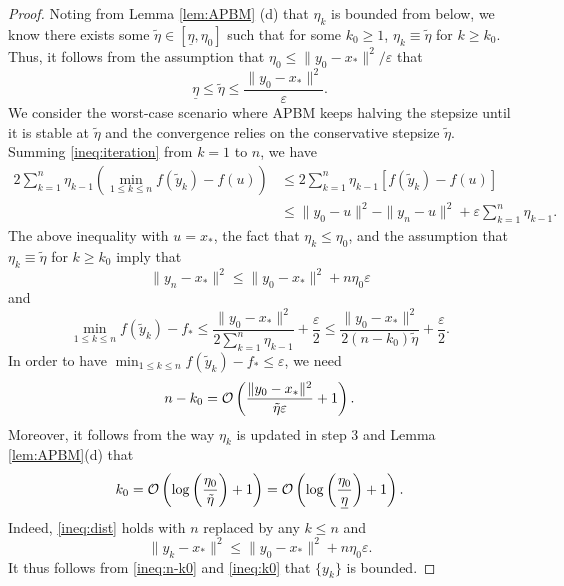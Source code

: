 \documentclass[11pt,letterpaper]{article}
\begin{document}
\begin{proof}
Noting from Lemma \ref{lem:APBM} (d) that $\eta_k$ is bounded from below, we know there exists some $\tilde \eta \in [\underline{\eta}, \eta_0]$ such that for some $k_0\ge 1$, $\eta_k\equiv \tilde \eta$ for $k\ge k_0$. Thus, it follows from the assumption that $\eta_0\le \|y_0-x_*\|^2/\varepsilon$ that
    \begin{equation}\label{cond:eta}
        \underline{\eta} \le \tilde \eta \le \frac{\|y_0-x_*\|^2}{\varepsilon}.
    \end{equation}
We consider the worst-case scenario where APBM keeps halving the stepsize until it is stable at $\tilde \eta$ and the convergence relies on the conservative stepsize $\tilde \eta$.
Summing \eqref{ineq:iteration} from $k=1$ to $n$, we have
    \begin{align*}
        2 \sum_{k=1}^n \eta_{k-1} \left(\min_{1\le k \le n} f(\tilde y_k) - f(u)\right) &\le 2 \sum_{k=1}^n \eta_{k-1}[f(\tilde y_k) - f(u)] \\
        &\le \|y_0-u\|^2 - \|y_n-u\|^2 + \varepsilon \sum_{k=1}^n\eta_{k-1}.
    \end{align*}
The above inequality with $u=x_*$, the fact that $\eta_k \le \eta_0$, and the assumption that $\eta_k\equiv \tilde \eta$ for $k\ge k_0$ imply that
\begin{equation}\label{ineq:dist}
    \|y_n-x_*\|^2 \le \|y_0-x_*\|^2 + n \eta_0 \varepsilon 
\end{equation}
and
\[
\min_{1\le k \le n} f(\tilde y_k) - f_* \le \frac{\|y_0-x_*\|^2}{2 \sum_{k=1}^n \eta_{k-1}} + \frac{\varepsilon}{2} \le \frac{\|y_0-x_*\|^2}{2(n-k_0) \tilde \eta} + \frac{\varepsilon}{2}.
\]
In order to have $\min_{1\le k \le n} f(\tilde y_k) - f_* \le \varepsilon$, we need
\begin{equation}\label{ineq:n-k0}
    n-k_0= {\cal O} \left(\frac{\|y_0-x_*\|^2}{\tilde \eta\varepsilon}+1\right).
\end{equation}
Moreover, it follows from the way $\eta_k$ is updated in step 3 and Lemma \ref{lem:APBM}(d) that
\begin{equation}\label{ineq:k0}
    k_0 = {\cal O}\left( \log\left(\frac{\eta_0}{\tilde\eta}\right) + 1\right) = {\cal O}\left( \log\left(\frac{\eta_0}{\underline{\eta}}\right) + 1\right).
\end{equation}
Indeed, \eqref{ineq:dist} holds with $n$ replaced by any $k \le n$ and
\[
\|y_k-x_*\|^2 \le \|y_0-x_*\|^2 + n \eta_0 \varepsilon.
\]
It thus follows from \eqref{ineq:n-k0} and \eqref{ineq:k0} that $\{y_k\}$ is bounded.

\end{proof}
\end{document}
